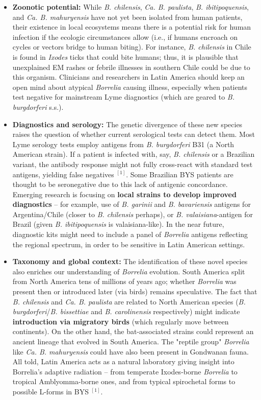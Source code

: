 \documentclass[11pt,letterpaper]{article}
\newcommand{\mycite}[1]{$^{[#1]}$}
\begin{document}
\begin{itemize}
    \item \textbf{Zoonotic potential:} While \textit{B. chilensis}, \textit{Ca. B. paulista}, \textit{B. ibitipoquensis}, and \textit{Ca. B. mahuryensis} have not yet been isolated from human patients, their existence in local ecosystems means there is a potential risk for human infection if the ecologic circumstances allow (i.e., if humans encroach on cycles or vectors bridge to human biting). For instance, \textit{B. chilensis} in Chile is found in \textit{Ixodes} ticks that could bite humans; thus, it is plausible that unexplained EM rashes or febrile illnesses in southern Chile could be due to this organism. Clinicians and researchers in Latin America should keep an open mind about atypical \textit{Borrelia} causing illness, especially when patients test negative for mainstream Lyme diagnostics (which are geared to \textit{B. burgdorferi} s.s.).

    \item \textbf{Diagnostics and serology:} The genetic divergence of these new species raises the question of whether current serological tests can detect them. Most Lyme serology tests employ antigens from \textit{B. burgdorferi} B31 (a North American strain). If a patient is infected with, say, \textit{B. chilensis} or a Brazilian variant, the antibody response might not fully cross-react with standard test antigens, yielding false negatives \mycite{1}. Some Brazilian BYS patients are thought to be seronegative due to this lack of antigenic concordance. Emerging research is focusing on \textbf{local strains to develop improved diagnostics} – for example, use of \textit{B. garinii} and \textit{B. bavariensis} antigens for Argentina/Chile (closer to \textit{B. chilensis} perhaps), or \textit{B. valaisiana}-antigen for Brazil (given \textit{B. ibitipoquensis} is valaisiana-like). In the near future, diagnostic kits might need to include a panel of \textit{Borrelia} antigens reflecting the regional spectrum, in order to be sensitive in Latin American settings.

    \item \textbf{Taxonomy and global context:} The identification of these novel species also enriches our understanding of \textit{Borrelia} evolution. South America split from North America tens of millions of years ago; whether \textit{Borrelia} was present then or introduced later (via birds) remains speculative. The fact that \textit{B. chilensis} and \textit{Ca. B. paulista} are related to North American species (\textit{B. burgdorferi}/\textit{B. bissettiae} and \textit{B. carolinensis} respectively) might indicate \textbf{introduction via migratory birds} (which regularly move between continents). On the other hand, the bat-associated strains could represent an ancient lineage that evolved in South America. The "reptile group" \textit{Borrelia} like \textit{Ca. B. mahuryensis} could have also been present in Gondwanan fauna. All told, Latin America acts as a natural laboratory giving insight into Borrelia's adaptive radiation – from temperate Ixodes-borne \textit{Borrelia} to tropical Amblyomma-borne ones, and from typical spirochetal forms to possible L-forms in BYS \mycite{1}.


\end{itemize}
\end{document}
